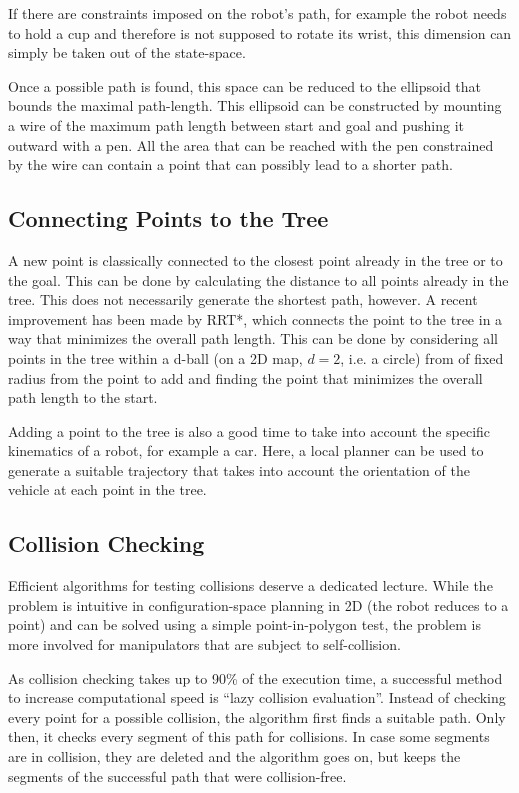 If there are constraints imposed on the robot's path, for example the robot needs to hold a cup and therefore is not supposed to rotate its wrist, this dimension can simply be taken out of the state-space.

Once a possible path is found, this space can be reduced to the ellipsoid that bounds the maximal path-length. This ellipsoid can be constructed by mounting a wire of the maximum path length between start and goal and pushing it outward with a pen. All the area that can be reached with the pen constrained by the wire can contain a point that can possibly lead to a shorter path.

\subsection{Connecting Points to the Tree}
A new point is classically connected to the closest point already in the tree or to the goal. This can be done by calculating the distance to all points already in the tree. This does not necessarily generate the shortest path, however. A recent improvement has been made by RRT*, which connects the point to the tree in a way that minimizes the overall path length. This can be done by considering all points in the tree within a d-ball (on a 2D map, $d=2$, i.e. a circle) from of fixed radius from the point to add and finding the point that minimizes the overall path length to the start.

Adding a point to the tree is also a good time to take into account the specific kinematics of a robot, for example a car. Here, a local planner can be used to generate a suitable trajectory that takes into account the orientation of the vehicle at each point in the tree.

\subsection{Collision Checking}
Efficient algorithms for testing collisions deserve a dedicated lecture. While the problem is intuitive in configuration-space planning in 2D (the robot reduces to a point) and can be solved using a simple point-in-polygon test, the problem is more involved for manipulators that are subject to self-collision.

As collision checking takes up to 90\% of the execution time, a successful method to increase computational speed is ``lazy collision evaluation''. Instead of checking every point for a possible collision, the algorithm first finds a suitable path. Only then, it checks every segment of this path for collisions. In case some segments are in collision, they are deleted and the algorithm goes on, but keeps the segments of the successful path that were collision-free.

